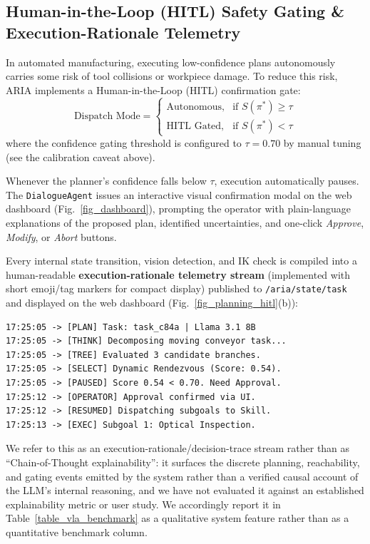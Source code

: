 \documentclass[journal]{IEEEtran}
\begin{document}
\subsection{Human-in-the-Loop (HITL) Safety Gating \& Execution-Rationale Telemetry}
In automated manufacturing, executing low-confidence plans autonomously carries some risk of tool collisions or workpiece damage. To reduce this risk, ARIA implements a Human-in-the-Loop (HITL) confirmation gate:
\begin{equation}
\text{Dispatch Mode} = \begin{cases}
\text{Autonomous}, & \text{if } S(\pi^*) \ge \tau \\
\text{HITL Gated}, & \text{if } S(\pi^*) < \tau
\end{cases}
\end{equation}
where the confidence gating threshold is configured to $\tau = 0.70$ by manual tuning (see the calibration caveat above).

Whenever the planner's confidence falls below $\tau$, execution automatically pauses. The \texttt{DialogueAgent} issues an interactive visual confirmation modal on the web dashboard (Fig.~\ref{fig_dashboard}), prompting the operator with plain-language explanations of the proposed plan, identified uncertainties, and one-click \textit{Approve}, \textit{Modify}, or \textit{Abort} buttons.

Every internal state transition, vision detection, and IK check is compiled into a human-readable \textbf{execution-rationale telemetry stream} (implemented with short emoji/tag markers for compact display) published to \texttt{/aria/state/task} and displayed on the web dashboard (Fig.~\ref{fig_planning_hitl}(b)):
{\scriptsize
\begin{verbatim}
17:25:05 -> [PLAN] Task: task_c84a | Llama 3.1 8B
17:25:05 -> [THINK] Decomposing moving conveyor task...
17:25:05 -> [TREE] Evaluated 3 candidate branches.
17:25:05 -> [SELECT] Dynamic Rendezvous (Score: 0.54).
17:25:05 -> [PAUSED] Score 0.54 < 0.70. Need Approval.
17:25:12 -> [OPERATOR] Approval confirmed via UI.
17:25:12 -> [RESUMED] Dispatching subgoals to Skill.
17:25:13 -> [EXEC] Subgoal 1: Optical Inspection.
\end{verbatim}
}
We refer to this as an execution-rationale/decision-trace stream rather than as ``Chain-of-Thought explainability'': it surfaces the discrete planning, reachability, and gating events emitted by the system rather than a verified causal account of the LLM's internal reasoning, and we have not evaluated it against an established explainability metric or user study. We accordingly report it in Table~\ref{table_vla_benchmark} as a qualitative system feature rather than as a quantitative benchmark column.
\end{document}
